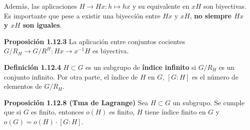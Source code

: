 \documentclass[a4paper, 11pt]{extarticle}
\newcommand{\propo}[1]{\textcolor{rojo}{\textbf{Proposición #1}}}
\newcommand{\defi}[1]{\textcolor{azul}{\textbf{Definición #1}}}
\begin{document}
Además, las aplicaciones \(H \rightarrow Hx: h \mapsto hx\) y su equivalente en \(xH\) son
biyectivas. Es importante que pese a existir una biyeccíón entre \(Hx\) y \(xH\), \textbf{no siempre \(Hx\) y \(xH\) son iguales}.

\propo{1.12.3} La aplicación entre conjuntos cocientes \(G/R_H \rightarrow G/R^H: Hx \rightarrow x^{-1}H\) es biyectiva.

\defi{1.12.4} \(H \subset G\) es un subgrupo de \textbf{índice infinito} si \(G/R_H\) es
un conjunto infinito. Por otra parte, el índice de \(H\) en \(G\), \([G:H]\) es el número de elementos de \(G/R_H\).

\propo{1.12.8 (Tma de Lagrange)} Sea \(H \subset G\) un subgrupo. Se cumple que si \(G\) es finito, entonces \(o(H)\) es
finito, \(H\) tiene índice finito en \(G\) y \(o(G) = o(H) \cdot [G:H]\).
\end{document}

